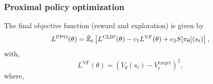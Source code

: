 \begin{frame}
	\frametitle{Proximal policy optimization}
	\begin{center}
		\begin{minipage}{10cm}
			\begin{myexampleblock}[10cm]{}
				The final objective function {\color{gray} (reward and exploration)} is given by\footnotemark[1]
				\begin{equation*}
					L^{\mathrm{PPO}}(\theta) = \hat{\mathbb{E}}_{t} \left[  L^{\mathrm{CLIP}}(\theta) - c_1 L^{\mathrm{VF}}(\theta)  + c_2 S[\pi_\theta](s_t)  \right],			
				\end{equation*}	
				with,
				\begin{equation*}
					L^{\mathrm{VF}}(\theta) = \left( V_\theta (s_t) - V^{\mathrm{target}}_{t}  \right)^{2},
				\end{equation*}			
				where,
				\newline
				\hspace{10px}
			\end{myexampleblock}
		\end{minipage}
	\end{center}
	
\end{frame}

